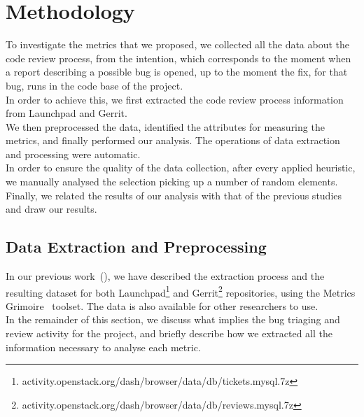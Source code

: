 \documentclass[10pt, conference]{IEEEtran}
\begin{document}
\section{Methodology}
To investigate the metrics that we proposed, we collected all the data about 
the code review process, from the intention, which corresponds to the moment when 
a report describing a possible bug is opened, 
up to the moment the fix, for that bug, runs in the code base of the project.
\\
In order to achieve this, we first extracted the code review process 
information from Launchpad and Gerrit.
\\
We then preprocessed the data, identified the attributes for
measuring the metrics, and finally performed our analysis.
The operations of data extraction and processing were automatic. 
\\
In order to ensure the quality 
of the data collection,
after every applied heuristic, we manually analysed the
selection picking up a number of random elements.
Finally, we related the results of our analysis with that of the previous
studies and draw our results.

\subsection{Data Extraction and Preprocessing}

In our previous work~(\cite{bib019,bib020}), we have described the extraction process and the 
resulting dataset for both Launchpad\footnote{activity.openstack.org/dash/browser/data/db/tickets.mysql.7z} 
and Gerrit\footnote{activity.openstack.org/dash/browser/data/db/reviews.mysql.7z} repositories, 
using the Metrics Grimoire~\cite{bib018} toolset. 
The data is also available for other researchers to use. 
\\
In the remainder of this section, we
discuss what implies the bug triaging and review activity for the project, and briefly
describe how we extracted all the information necessary to analyse each metric.
\\
\end{document}
